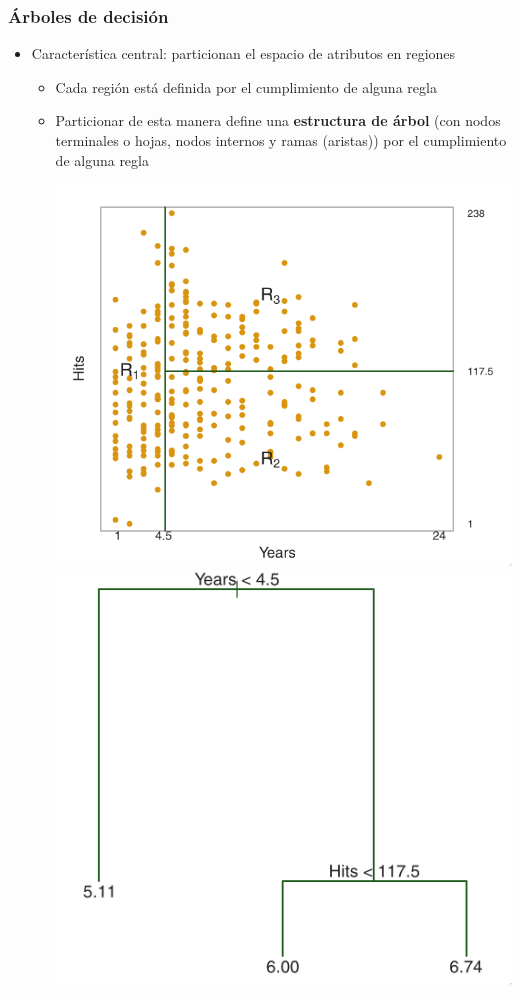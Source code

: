 \documentclass[leqno, 10pt, envcountsect]{beamer}
\numberwithin{equation}{section}
\theoremstyle{definition}
\theoremstyle{example}
\numberwithin{figure}{section}
\numberwithin{table}{section}
\let\olditem\item
\renewcommand{\item}{%
\olditem\vspace{1pt}}
\begin{document}
\begin{frame}[fragile=singleslide]
  \frametitle{Árboles de decisión}
  \begin{itemize}
    \item Característica central: particionan el espacio de atributos en
      regiones
      \begin{itemize}
        \item Cada región está definida por el cumplimiento de alguna regla
        \item Particionar de esta manera define una \textbf{estructura de árbol}
          (con nodos terminales o hojas, nodos internos y ramas (aristas))
          por el cumplimiento de alguna regla
          \begin{center}
            \includegraphics[scale=0.2]{tree_regions.png}
            \includegraphics[scale=0.23]{tree.png}

\end{center}
\end{itemize}
\end{itemize}
\end{frame}
\end{document}
